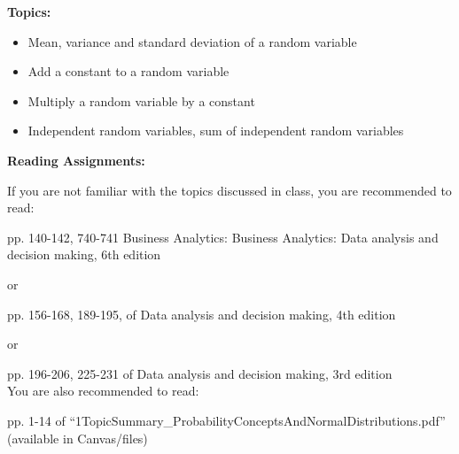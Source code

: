 \documentclass[11pt]{article}
\begin{document}
\vspace{2mm}
\noindent\textbf{Topics:}
\begin{itemize}
\item Mean, variance and standard deviation of a random variable

\item Add a constant to a random variable
\item Multiply a random variable by a constant

\item Independent random variables,  sum of independent random variables

\end{itemize}


\noindent\textbf{Reading Assignments:}

If you are not familiar with the topics discussed in class, you are recommended to read:

pp. 140-142, 740-741 %
Business Analytics: Business Analytics: Data analysis and decision making, 6th edition

or 

pp. 156-168, 189-195,  of Data analysis and decision making, 4th edition

or 

pp. 196-206, 225-231 of  Data analysis and decision making, 3rd edition\\

You are also recommended to read:

pp. 1-14 of ``1TopicSummary\_ProbabilityConceptsAndNormalDistributions.pdf'' (available in Canvas/files) \\
\end{document}
